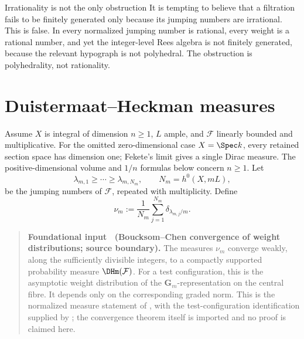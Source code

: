 \begin{warning}{Irrationality is not the only obstruction}
\label{warn:ch33-not-only-irrationality}
It is tempting to believe that a filtration fails to be finitely generated
only because its jumping numbers are irrational.  This is false.  In
 every normalized jumping number is rational,
every weight is a rational number, and yet the integer-level Rees
algebra is not finitely
generated, because the relevant hypograph is not polyhedral.  The
obstruction is polyhedrality, not rationality.
\end{warning}

\section{Duistermaat--Heckman measures}
\label{sec:ch33-dh}

Assume $X$ is integral of dimension $n\geq1$, $L$ ample, and
$\mathcal F$ linearly bounded and multiplicative.  For the omitted
zero-dimensional case $X=\Spec k$, every retained section space has
dimension one; Fekete's limit gives a single Dirac measure.  The
positive-dimensional volume and $1/n$ formulas below concern $n\geq1$.  Let
\begin{equation}
\label{eq:jumping-numbers}
 \lambda_{m,1}\geq\cdots\geq\lambda_{m,N_m},
 \qquad N_m=h^0(X,mL),
\end{equation}
be the jumping numbers of $\mathcal F$, repeated with multiplicity.  Define
\begin{equation}
\label{eq:empirical-weight-measure}
 \nu_m:=\frac1{N_m}\sum_{j=1}^{N_m}
                    \delta_{\lambda_{m,j}/m}.
\end{equation}

\label{thm:dh-limit-filtration}
\begin{quote}
\textbf{Foundational input \thetheorem\ (Boucksom--Chen convergence of
weight distributions; source boundary).}
The measures $\nu_m$ converge weakly, along the sufficiently divisible
integers, to a compactly supported probability measure
$\DHm(\mathcal F)$.  For a test configuration, this is the asymptotic
weight distribution of the $\mathbf G_m$-representation on the central
fibre.  It depends only on the corresponding graded norm.
This is the normalized measure statement of \cite[Theorem~A]{BC11}, with
the test-configuration identification supplied by
; the convergence theorem itself is
imported and no proof is claimed here.
\end{quote}

